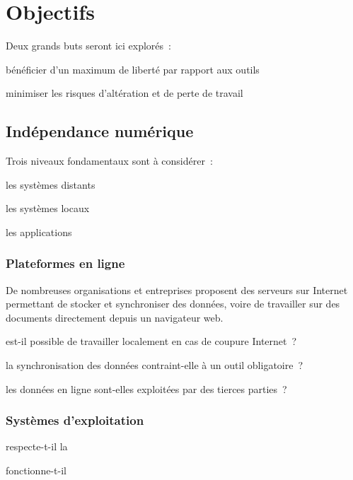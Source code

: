 \section{Objectifs}

Deux grands buts seront ici explorés :
\begin{itmz}
\item{bénéficier d’un maximum de liberté par rapport aux outils}
\item{minimiser les risques d’altération et de perte de travail}
\end{itmz}

\subsection{Indépendance numérique}

Trois niveaux fondamentaux sont à considérer :
\begin{itmz}
\item{les systèmes distants}
\item{les systèmes locaux}
\item{les applications}
\end{itmz}

\subsubsection{Plateformes en ligne}

De nombreuses organisations et entreprises proposent des serveurs sur Internet
permettant de stocker et synchroniser des données, voire de travailler sur des
documents directement depuis un navigateur web.

\begin{itmz}
\item{est-il possible de travailler localement en cas de coupure Internet ?}
\item{la synchronisation des données contraint-elle à un outil obligatoire ?}
\item{les données en ligne sont-elles exploitées par des tierces parties ?}
\end{itmz}

\subsubsection{Systèmes d’exploitation}

\begin{itmz}
\item{respecte-t-il la }
\item{fonctionne-t-il }
\end{itmz}

